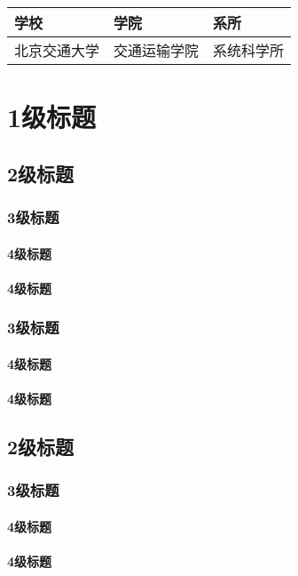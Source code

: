 \begin{bjtutable}
	\begin{tabularx}{\textwidth}{X<{\centering}X<{\centering}X<{\centering}}
		\toprule
		学校&学院&系所\\
		\midrule
		北京交通大学&交通运输学院&系统科学所\\
		\bottomrule
	\end{tabularx}
\end{bjtutable}



\chapter{1级标题}
\section{2级标题}
\subsection{3级标题}
\subsubsection{4级标题}
\subsubsection{4级标题}
\subsection{3级标题}
\subsubsection{4级标题}
\subsubsection{4级标题}
\section{2级标题}
\subsection{3级标题}
\subsubsection{4级标题}
\subsubsection{4级标题}
